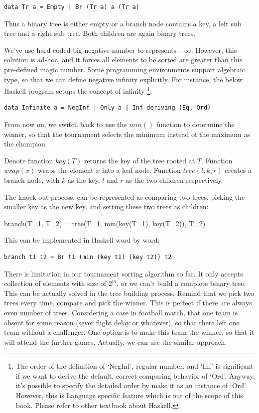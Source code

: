 \documentclass[b5paper]{article}
\begin{document}
\lstset{language=Haskell}
\begin{lstlisting}
data Tr a = Empty | Br (Tr a) a (Tr a)
\end{lstlisting}

Thus a binary tree is either empty or a branch node contains a key, a left sub tree and a right sub tree.
Both children are again binary trees.

We've use hard coded big negative number to represents $-\infty$. However, this solution is ad-hoc, and
it forces all elements to be sorted are greater than this pre-defined magic number. Some programming
environments support algebraic type, so that we can define negative infinity explicitly. For instance,
the below Haskell program setups the concept of infinity \footnote{The order of the definition of `NegInf',
regular number, and `Inf' is significant if we want to derive the default, correct comparing behavior of `Ord'.
Anyway, it's possible to specify the detailed order by make it as an instance of `Ord'. However, this is
Language specific feature which is out of the scope of this book. Please refer to other textbook about Haskell.}.

\lstset{language=Haskell}
\begin{lstlisting}
data Infinite a = NegInf | Only a | Inf deriving (Eq, Ord)
\end{lstlisting}

From now on, we switch back to use the $min()$ function to determine the winner, so that the tournament selects the minimum
instead of the maximum as the champion.

Denote function $key(T)$ returns the key of the tree rooted at $T$. Function $wrap(x)$ wraps the element
$x$ into a leaf node. Function $tree(l, k, r)$ creates a branch node, with $k$ as the key, $l$ and $r$
as the two children respectively.

The knock out process, can be represented as comparing two trees, picking the smaller key as the new
key, and setting these two trees as children:

\be
branch(T_1, T_2) = tree(T_1, min(key(T_1), key(T_2)), T_2)
\ee

This can be implemented in Haskell word by word:

\lstset{language=Haskell}
\begin{lstlisting}
branch t1 t2 = Br t1 (min (key t1) (key t2)) t2
\end{lstlisting}

There is limitation in our tournament sorting algorithm so far. It only accepts collection of elements
with size of $2^m$, or we can't build a complete binary tree. This can be actually solved in the tree
building process. Remind that we pick two trees every time, compare and pick the winner. This is perfect
if there are always even number of trees. Considering a case in football match, that one team is absent
for some reason (sever flight delay or whatever), so that there left one team without a challenger.
One option is to make this team the winner, so that it will attend the further games. Actually, we can
use the similar approach.
\end{document}
